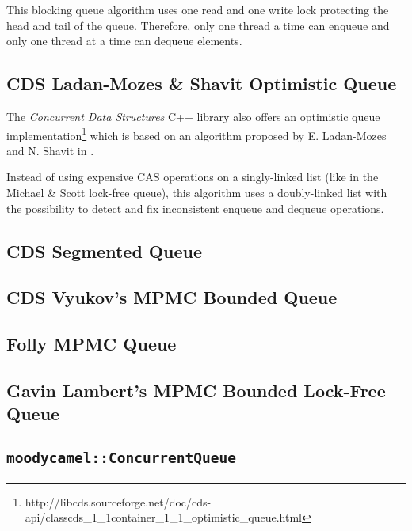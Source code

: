	This blocking queue algorithm uses one read and one write lock protecting the head and tail of the queue. Therefore, only one thread a time can enqueue and only one thread at a time can dequeue elements.

\subsection[CDS OptimisticQueue]{CDS Ladan-Mozes \& Shavit Optimistic Queue} \label{subsec:cds-optimistic}

	The \textit{Concurrent Data Structures} C++ library also offers an optimistic queue implementation\footnote{http://libcds.sourceforge.net/doc/cds-api/classcds\_1\_1container\_1\_1\_optimistic\_queue.html} which is based on an algorithm proposed by E. Ladan-Mozes and N. Shavit in \cite{Ladan-Mozes:2004}.
	
	Instead of using expensive CAS operations on a singly-linked list (like in the Michael \& Scott lock-free queue), this algorithm uses a doubly-linked list with the possibility to detect and fix inconsistent enqueue and dequeue operations.

\subsection[CDS SegmentedQueue]{CDS Segmented Queue} \label{subsec:cds-segmented}

\subsection[CDS VyukovMPMCCycleQueue]{CDS Vyukov's MPMC Bounded Queue} \label{subsec:cds-vyukovmpmccycle}

\subsection[Folly MPMC Queue]{Folly MPMC Queue}

\subsection[Gavin Lambert's MPMC Queue]{Gavin Lambert's MPMC Bounded Lock-Free Queue}

\subsection[\lstinline{moodycamel::ConcurrentQueue}]{\lstinline{moodycamel::ConcurrentQueue}}

